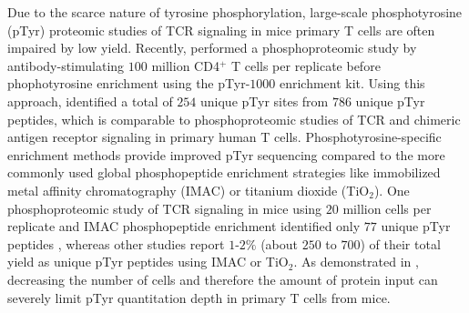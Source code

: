 \documentclass[journal=jprobs,manuscript=article]{achemso}
\begin{document}

Due to the scarce nature of tyrosine phosphorylation, large-scale phosphotyrosine (pTyr) proteomic studies of TCR signaling in mice primary T cells are often impaired by low yield. Recently, \citeauthor{locard2020lymphoatlas} performed a phosphoproteomic study by antibody-stimulating $100$ million CD4$^{+}$ T cells per replicate before phophotyrosine enrichment using the pTyr-$1000$ enrichment kit. Using this approach, \citeauthor{locard2020lymphoatlas} identified a total of $254$ unique pTyr sites from $786$ unique pTyr peptides, which is comparable to phosphoproteomic studies of TCR and chimeric antigen receptor signaling in primary human T cells\cite{joshi2017phosphoproteomics,salter2021comparative,ramello2019immunoproteomic}. Phosphotyrosine-specific enrichment methods provide improved pTyr sequencing compared to the more commonly used global phosphopeptide enrichment strategies like immobilized metal affinity chromatography (IMAC) or titanium dioxide (TiO$_{2}$)\cite{navarro2011phosphoproteomic,prado2021synergistic}. One phosphoproteomic study of TCR signaling in mice using $20$ million cells per replicate and IMAC phosphopeptide enrichment identified only $77$ unique pTyr peptides \cite{iwai2010quantitative}, whereas other studies report $1$-$2\%$ (about $250$ to $700$) of their total yield as unique pTyr peptides using IMAC or TiO$_{2}$\cite{alvarez202023,navarro2011phosphoproteomic}. As demonstrated in \citeauthor{iwai2010quantitative}, decreasing the number of cells and therefore the amount of protein input can severely limit pTyr quantitation depth in primary T cells from mice. 


\end{document}
